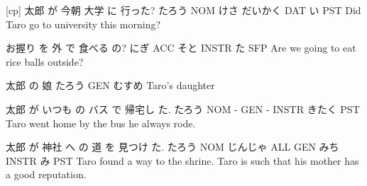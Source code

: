 [cp]
太郎   が  今朝 大学    に   行った?
たろう NOM けさ だいかく DAT い PST
Did Taro go to university this morning?

お握り を   外  で      食べる の?
にぎ   ACC そと INSTR  た SFP
Are we going to eat rice balls outside?

太郎   の   娘
たろう GEN むすめ
Taro's daughter

太郎   が いつも の  バス で    帰宅し た.
たろう NOM -    GEN -   INSTR きたく PST
Taro went home by the bus he always rode.

太郎   が  神社    へ   の  道   を    見つけ た.
たろう NOM じんじゃ ALL GEN みち INSTR み    PST
Taro found a way to the shrine.
Taro is such that his mother has a good reputation.

